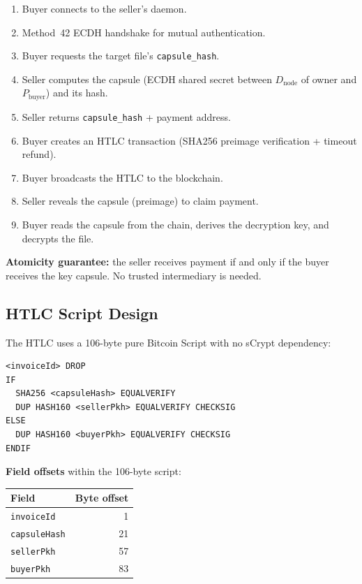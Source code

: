 \documentclass[11pt,a4paper]{article}
\begin{document}
\begin{enumerate}
\item Buyer connects to the seller's daemon.
\item Method~42 ECDH handshake for mutual authentication.
\item Buyer requests the target file's \texttt{capsule\_hash}.
\item Seller computes the capsule (ECDH shared secret between $D_{\text{node}}$ of owner and $P_{\text{buyer}}$) and its hash.
\item Seller returns \texttt{capsule\_hash} + payment address.
\item Buyer creates an HTLC transaction (SHA256 preimage verification + timeout refund).
\item Buyer broadcasts the HTLC to the blockchain.
\item Seller reveals the capsule (preimage) to claim payment.
\item Buyer reads the capsule from the chain, derives the decryption key, and decrypts the file.
\end{enumerate}

\textbf{Atomicity guarantee:} the seller receives payment if and only if the buyer receives the key capsule. No trusted intermediary is needed.

\subsection{HTLC Script Design}

The HTLC uses a 106-byte pure Bitcoin Script with no sCrypt dependency:

\begin{lstlisting}
<invoiceId> DROP
IF
  SHA256 <capsuleHash> EQUALVERIFY
  DUP HASH160 <sellerPkh> EQUALVERIFY CHECKSIG
ELSE
  DUP HASH160 <buyerPkh> EQUALVERIFY CHECKSIG
ENDIF
\end{lstlisting}

\textbf{Field offsets} within the 106-byte script:

\begin{table}[h]
\centering
\begin{tabular}{@{}lr@{}}
\toprule
\textbf{Field} & \textbf{Byte offset} \\
\midrule
\texttt{invoiceId} & 1 \\
\texttt{capsuleHash} & 21 \\
\texttt{sellerPkh} & 57 \\
\texttt{buyerPkh} & 83 \\
\bottomrule
\end{tabular}
\end{table}
\end{document}

